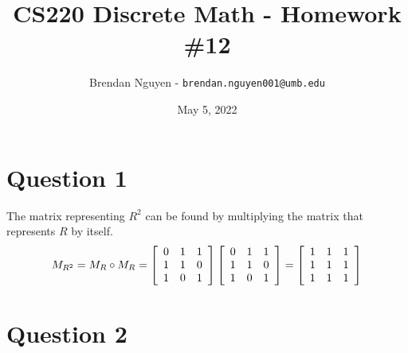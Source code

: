 \documentclass[letterpaper, 12pt]{article}
\title{CS220 Discrete Math - Homework \#12}
\author{Brendan Nguyen - \texttt{brendan.nguyen001@umb.edu}}
\date{May 5, 2022}
\begin{document}
\maketitle

\section*{Question 1}
The matrix representing $R^2$ can be found by multiplying the matrix that represents $R$ by itself.
\[
M_{R^2} = M_R \circ M_R = 
\left[
\begin{array}{c c c}
    0 & 1 & 1 \\
    1 & 1 & 0 \\
    1 & 0 & 1
\end{array}
\right]
\left[
\begin{array}{c c c}
    0 & 1 & 1 \\
    1 & 1 & 0 \\
    1 & 0 & 1
\end{array}
\right]
= 
\left[
\begin{array}{c c c}
    1 & 1 & 1 \\
    1 & 1 & 1 \\
    1 & 1 & 1
\end{array}
\right]
\]

\section*{Question 2}
\end{document}
